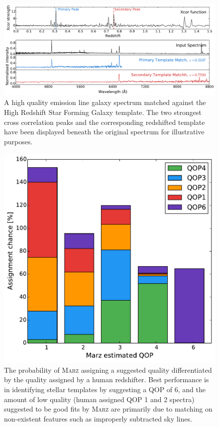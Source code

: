 \documentclass[iop]{emulateapj}
\newcommand{\marz}{\textsc{Marz}}
\begin{document}
\begin{figure}[t]
\centering
\includegraphics[width=\textwidth]{xcors.pdf}
\caption{A high quality emission line galaxy spectrum matched against the High Redshift Star Forming Galaxy template. The two strongest cross correlation peaks and the corresponding redshifted template have been displayed beneath the original spectrum for illustrative purposes.}
\label{fig:xcors}
\end{figure}


\begin{figure}[h]
\centering
\includegraphics[width=\columnwidth]{autoqop.pdf}
\caption{The probability of \marz{} assigning a suggested quality differentiated by the quality assigned by a human redshifter. Best performance is in identifying stellar templates by suggesting a QOP of 6, and the amount of low quality (human assigned QOP 1 and 2 spectra) suggested to be good fits by \marz{} are primarily due to matching on non-existent features such as improperly subtracted sky lines.}
\label{fig:autoqop}
\end{figure}
\end{document}
